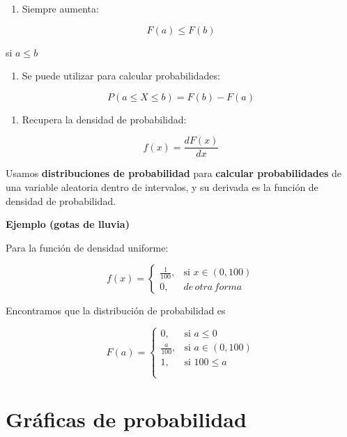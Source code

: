 \documentclass[
]{book}
\providecommand{\tightlist}{%
  \setlength{\itemsep}{0pt}\setlength{\parskip}{0pt}}
\begin{document}
\begin{enumerate}
\def\labelenumi{\arabic{enumi})}
\setcounter{enumi}{1}
\tightlist
\item
  Siempre aumenta:
\end{enumerate}

\[F(a)\leq F(b)\]

si \(a \leq b\)

\begin{enumerate}
\def\labelenumi{\arabic{enumi})}
\setcounter{enumi}{2}
\tightlist
\item
  Se puede utilizar para calcular probabilidades:
\end{enumerate}

\[P( a \leq X \leq b)=F(b)-F(a)\]

\begin{enumerate}
\def\labelenumi{\arabic{enumi})}
\setcounter{enumi}{3}
\tightlist
\item
  Recupera la densidad de probabilidad:
\end{enumerate}

\[f(x)=\frac{ dF (x )}{ dx}\]

Usamos \textbf{distribuciones de probabilidad} para \textbf{calcular probabilidades} de una variable aleatoria dentro de intervalos, y su derivada es la función de densidad de probabilidad.

\textbf{Ejemplo (gotas de lluvia)}

Para la función de densidad uniforme:

\[
    f(x)= 
\begin{cases}
    \frac{1}{100},& \text{si } x\in (0,100)\\
    0,& de\, otra\, forma 
\end{cases}
\]

Encontramos que la distribución de probabilidad es

\[
    F(a)= 
\begin{cases}
    0,& \text{si } a \leq 0 \\
    \frac{a}{100},& \text{si } a\in (0,100)\\
    1, & \text{si } 100 \leq a \\
    \\
\end{cases}
\]

\newpage

\hypertarget{gruxe1ficas-de-probabilidad}{%
\section{Gráficas de probabilidad}\label{gruxe1ficas-de-probabilidad}}
\end{document}
